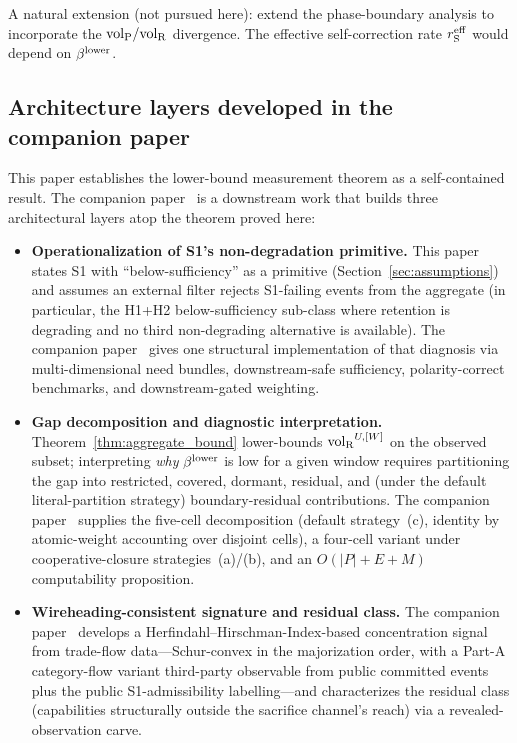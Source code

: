 A natural extension (not pursued here): extend the phase-boundary
analysis to incorporate the ${\operatorname{vol}_{\mathrm{P}}}/{\operatorname{vol}_{\mathrm{R}}}$ divergence.  The
effective self-correction rate $r_{\mathrm{S}}^{\mathrm{eff}}$ would depend
on $\beta^{\mathrm{lower}}$.

\subsection{Architecture layers developed in the companion
paper}
\label{sec:companion_pointer}

This paper establishes the lower-bound measurement theorem as a
self-contained result.  The companion
paper~\citep[Need~Sufficiency]{lasser2026paper8b} is a downstream work that
builds three architectural layers atop the theorem proved here:

\begin{itemize}
\item \textbf{Operationalization of S1's non-degradation
  primitive.}
  This paper states S1 with ``below-sufficiency'' as a primitive
  (Section~\ref{sec:assumptions}) and assumes an external filter
  rejects S1-failing events from the aggregate (in particular,
  the H1+H2 below-sufficiency sub-class where retention is
  degrading and no third non-degrading alternative is available).
  The
  companion paper~\citep[Need~Sufficiency, Section~2]{lasser2026paper8b}
  gives one
  structural implementation of that diagnosis via multi-dimensional
  need bundles, downstream-safe sufficiency, polarity-correct
  benchmarks, and downstream-gated weighting.
\item \textbf{Gap decomposition and diagnostic interpretation.}
  Theorem~\ref{thm:aggregate_bound} lower-bounds ${\operatorname{vol}_{\mathrm{R}}}^{U,[W]}$
  on the observed subset; interpreting \emph{why} $\beta^{\mathrm{lower}}$ is
  low for a given window requires partitioning the gap into
  restricted, covered, dormant, residual, and (under the default
  literal-partition strategy) boundary-residual contributions.
  The companion
  paper~\citep[Need~Sufficiency, Section~3]{lasser2026paper8b}
  supplies the five-cell decomposition (default strategy~(c),
  identity by atomic-weight accounting over disjoint cells), a
  four-cell variant under cooperative-closure
  strategies~(a)/(b), and an $O(|P| + E + M)$ computability
  proposition.
\item \textbf{Wireheading-consistent signature and residual
  class.}  The companion
  paper~\citep[Need~Sufficiency, Sections~4--5]{lasser2026paper8b}
  develops a
  Herfindahl--Hirschman-Index-based concentration signal from
  trade-flow data---Schur-convex in the majorization order,
  with a Part-A category-flow variant third-party observable
  from public committed events plus the public S1-admissibility
  labelling---and characterizes the
  residual class (capabilities structurally outside the
  sacrifice channel's reach) via a revealed-observation carve.
\end{itemize}

